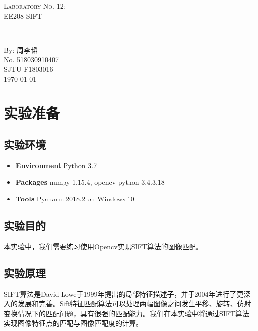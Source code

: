 \documentclass{article}
\newcommand{\labno}{12}
\newcommand{\labtitle}{EE208 SIFT}
\newcommand{\authorname}{周李韬}
\newcommand{\studentno}{518030910407}
\newcommand{\classno}{F1803016}
\begin{document}
\begin{center}
{\LARGE \textsc{Laboratory No. \labno:} \\ \vspace{4pt}}
{\Large \textsc{\labtitle} \\ \vspace{4pt}} 
\rule[13pt]{\textwidth}{1pt} \\ \vspace{15pt}
{\large By: \authorname \\ \vspace{10pt}
No. \studentno \\ \vspace{10pt}
SJTU \classno \\ \vspace{10pt}
\today \vspace{20pt}}
\end{center}



\section{实验准备}

\subsection{实验环境}
\begin{itemize}
\item\textbf{Environment} Python 3.7
\item\textbf{Packages} numpy 1.15.4, opencv-python 3.4.3.18
\item\textbf{Tools} Pycharm 2018.2 on Windows 10
\end{itemize}

\subsection{实验目的}

本实验中，我们需要练习使用Opencv实现SIFT算法的图像匹配。

\subsection{实验原理}

SIFT算法是David Lowe于1999年提出的局部特征描述子，并于2004年进行了更深入的发展和完善。Sift特征匹配算法可以处理两幅图像之间发生平移、旋转、仿射变换情况下的匹配问题，具有很强的匹配能力。我们在本实验中将通过SIFT算法实现图像特征点的匹配与图像匹配度的计算。
\end{document}
